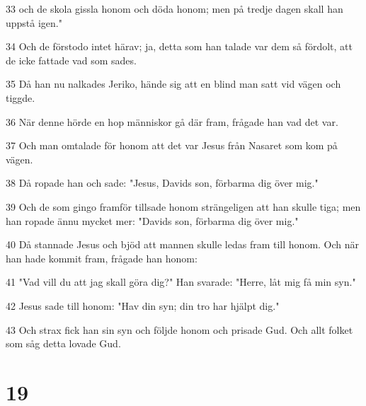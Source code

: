 \par 33 och de skola gissla honom och döda honom; men på tredje dagen skall han uppstå igen."
\par 34 Och de förstodo intet härav; ja, detta som han talade var dem så fördolt, att de icke fattade vad som sades.
\par 35 Då han nu nalkades Jeriko, hände sig att en blind man satt vid vägen och tiggde.
\par 36 När denne hörde en hop människor gå där fram, frågade han vad det var.
\par 37 Och man omtalade för honom att det var Jesus från Nasaret som kom på vägen.
\par 38 Då ropade han och sade: "Jesus, Davids son, förbarma dig över mig."
\par 39 Och de som gingo framför tillsade honom strängeligen att han skulle tiga; men han ropade ännu mycket mer: "Davids son, förbarma dig över mig."
\par 40 Då stannade Jesus och bjöd att mannen skulle ledas fram till honom. Och när han hade kommit fram, frågade han honom:
\par 41 "Vad vill du att jag skall göra dig?" Han svarade: "Herre, låt mig få min syn."
\par 42 Jesus sade till honom: "Hav din syn; din tro har hjälpt dig."
\par 43 Och strax fick han sin syn och följde honom och prisade Gud. Och allt folket som såg detta lovade Gud.

\chapter{19}

